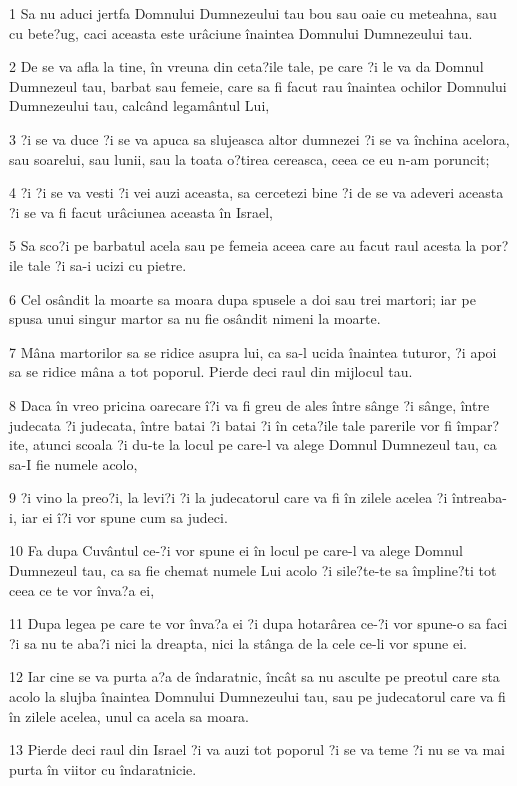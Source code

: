 \par 1 Sa nu aduci jertfa Domnului Dumnezeului tau bou sau oaie cu meteahna, sau cu bete?ug, caci aceasta este urâciune înaintea Domnului Dumnezeului tau.
\par 2 De se va afla la tine, în vreuna din ceta?ile tale, pe care ?i le va da Domnul Dumnezeul tau, barbat sau femeie, care sa fi facut rau înaintea ochilor Domnului Dumnezeului tau, calcând legamântul Lui,
\par 3 ?i se va duce ?i se va apuca sa slujeasca altor dumnezei ?i se va închina acelora, sau soarelui, sau lunii, sau la toata o?tirea cereasca, ceea ce eu n-am poruncit;
\par 4 ?i ?i se va vesti ?i vei auzi aceasta, sa cercetezi bine ?i de se va adeveri aceasta ?i se va fi facut urâciunea aceasta în Israel,
\par 5 Sa sco?i pe barbatul acela sau pe femeia aceea care au facut raul acesta la por?ile tale ?i sa-i ucizi cu pietre.
\par 6 Cel osândit la moarte sa moara dupa spusele a doi sau trei martori; iar pe spusa unui singur martor sa nu fie osândit nimeni la moarte.
\par 7 Mâna martorilor sa se ridice asupra lui, ca sa-l ucida înaintea tuturor, ?i apoi sa se ridice mâna a tot poporul. Pierde deci raul din mijlocul tau.
\par 8 Daca în vreo pricina oarecare î?i va fi greu de ales între sânge ?i sânge, între judecata ?i judecata, între batai ?i batai ?i în ceta?ile tale parerile vor fi împar?ite, atunci scoala ?i du-te la locul pe care-l va alege Domnul Dumnezeul tau, ca sa-I fie numele acolo,
\par 9 ?i vino la preo?i, la levi?i ?i la judecatorul care va fi în zilele acelea ?i întreaba-i, iar ei î?i vor spune cum sa judeci.
\par 10 Fa dupa Cuvântul ce-?i vor spune ei în locul pe care-l va alege Domnul Dumnezeul tau, ca sa fie chemat numele Lui acolo ?i sile?te-te sa împline?ti tot ceea ce te vor înva?a ei,
\par 11 Dupa legea pe care te vor înva?a ei ?i dupa hotarârea ce-?i vor spune-o sa faci ?i sa nu te aba?i nici la dreapta, nici la stânga de la cele ce-li vor spune ei.
\par 12 Iar cine se va purta a?a de îndaratnic, încât sa nu asculte pe preotul care sta acolo la slujba înaintea Domnului Dumnezeului tau, sau pe judecatorul care va fi în zilele acelea, unul ca acela sa moara.
\par 13 Pierde deci raul din Israel ?i va auzi tot poporul ?i se va teme ?i nu se va mai purta în viitor cu îndaratnicie.
